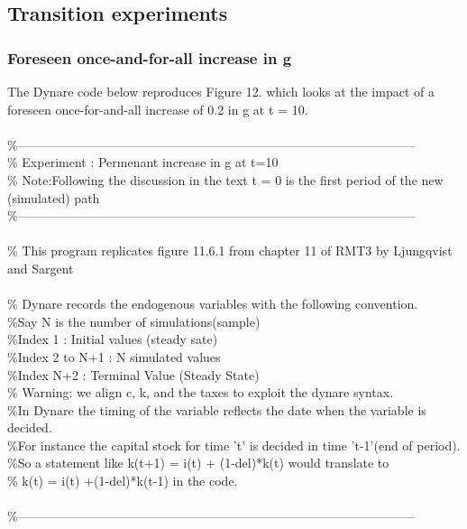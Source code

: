 \documentclass[a4paper,12pt]{scrartcl} %
\begin{document}
\subsection{Transition experiments}
\subsubsection{Foreseen once-and-for-all increase in g}

The Dynare code below reproduces Figure 12. which looks at the impact of a foreseen once-for-and-all increase of 0.2 in g at t = 10.\\
\\

\%-----------------------------------------------------------------------------------------------\\
\% Experiment  : Permenant increase in g at t=10\\
\% Note:Following the discussion in the text t = 0 is the first period of the new (simulated) path\\
\%-----------------------------------------------------------------------------------------------\\
\\
\% This program replicates figure 11.6.1 from chapter 11 of RMT3 by Ljungqvist and Sargent\\
\\
\% Dynare records the endogenous variables with the following convention.\\
\%Say N is the number of simulations(sample)\\
\%Index 1 : Initial values (steady sate)\\
\%Index 2 to N+1 : N simulated values\\
\%Index N+2 : Terminal Value (Steady State)\\
\% Warning:  we align c, k, and the taxes to exploit the dynare syntax.\\
\%In Dynare the timing of the variable reflects the date when the variable is decided.\\
\%For instance the capital stock for time 't' is decided in time 't-1'(end of period).\\
\%So a statement like k(t+1) = i(t) + (1-del)*k(t) would translate to\\
\% k(t) = i(t) +(1-del)*k(t-1) in the code.\\
\\
\%-----------------------------------------------------------------------------------------------\\
\end{document}
